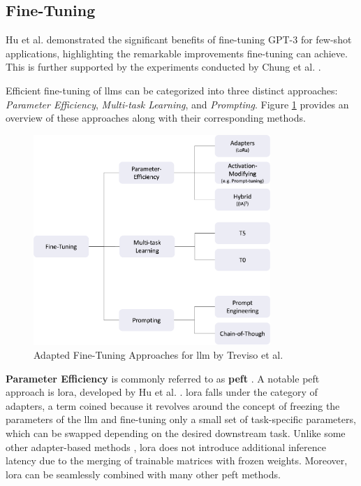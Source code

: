 
\subsection{Fine-Tuning}
\label{subsec:llm_fine_tuning}

Hu et al. \cite{hu_lora_nodate} demonstrated the significant benefits of fine-tuning GPT-3 for few-shot applications, highlighting the remarkable improvements fine-tuning can achieve. This is further supported by the experiments conducted by Chung et al. \cite{chung_scaling_2022}.

Efficient fine-tuning of \gls{llm}s can be categorized into three distinct approaches: \textit{Parameter Efficiency}, \textit{Multi-task Learning}, and \textit{Prompting}. Figure \ref{fig:llm_fine_tuning} provides an overview of these approaches along with their corresponding methods.

\begin{figure}[h]
    \centering
    \includegraphics[width=0.8\textwidth]{Grafiken/fine_tuning_approaches.png}
    \caption{Adapted Fine-Tuning Approaches for \gls{llm} by Treviso et al. \cite{treviso_efficient_2023}}
    \label{fig:llm_fine_tuning}
\end{figure}

\textbf{Parameter Efficiency} is commonly referred to as \textbf{\gls{peft}} \cite{noauthor_peft_nodate}. A notable \gls{peft} approach is \gls{lora}, developed by Hu et al. \cite{hu_lora_nodate}. \gls{lora} falls under the category of adapters, a term coined because it revolves around the concept of freezing the parameters of the \gls{llm} and fine-tuning only a small set of task-specific parameters, which can be swapped depending on the desired downstream task. Unlike some other adapter-based methods \cite{houlsby_parameter-efficient_2019}, \gls{lora} does not introduce additional inference latency due to the merging of trainable matrices with frozen weights. Moreover, \gls{lora} can be seamlessly combined with many other \gls{peft} methods.

